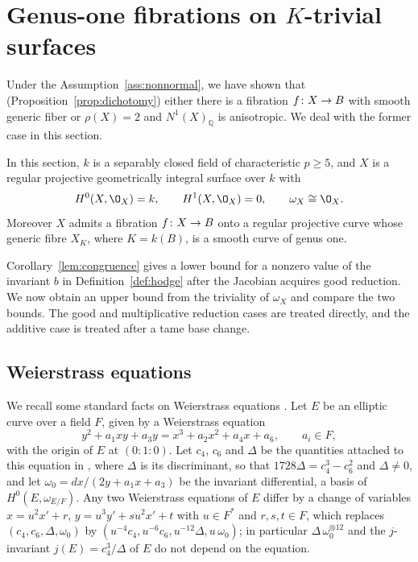 \section{Genus-one fibrations on $K$-trivial surfaces}\label{sec:genus-one}
Under the Assumption~\ref{ass:nonnormal}, we have shown that (Proposition~\ref{prop:dichotomy}) either there is a fibration $f\colon X\to B$ with smooth generic fiber or $\rho(X) = 2$ and $N^1(X)_{\mathbb Q}$ is anisotropic.
We deal with the former case in this section.

\begin{assumption}\label{ass:genus-one}
In this section, $k$ is a separably closed field of characteristic $p\geq 5$, and $X$ is a regular projective geometrically integral surface over $k$ with
\[
  H^0(X,\O_X) = k,\qquad H^1(X,\O_X) = 0,\qquad \omega_X\cong\O_X.
\]
Moreover $X$ admits a fibration $f\colon X\to B$ onto a regular projective curve whose generic fibre $X_K$, where $K = k(B)$, is a smooth curve of genus one.
\end{assumption}

Corollary~\ref{lem:congruence} gives a lower bound for a nonzero value of the invariant $b$ in Definition~\ref{def:hodge} after the Jacobian acquires good reduction.
We now obtain an upper bound from the triviality of $\omega_X$ and compare the two bounds.
The good and multiplicative reduction cases are treated directly, and the additive case is treated after a tame base change.


\subsection{Weierstrass equations}\label{subsec:weierstrass}

We recall some standard facts on Weierstrass equations \cite[\S1, (2.6) and Proposition~5.1]{Del75}.
Let $E$ be an elliptic curve over a field $F$, given by a Weierstrass equation
\[
  y^2+a_1xy+a_3y = x^3+a_2x^2+a_4x+a_6,\qquad a_i\in F,
\]
with the origin of $E$ at $(0:1:0)$.
Let $c_4$, $c_6$ and $\Delta$ be the quantities attached to this equation in \cite[(1.4) and (1.5)]{Del75}, where $\Delta$ is its discriminant, so that $1728\Delta = c_4^3-c_6^2$ and $\Delta\neq 0$, and let $\omega_0 = dx/(2y+a_1x+a_3)$ be the invariant differential, a basis of $H^0(E,\omega_{E/F})$.
Any two Weierstrass equations of $E$ differ by a change of variables $x = u^2x'+r$, $y = u^3y'+su^2x'+t$ with $u\in F^*$ and $r,s,t\in F$, which replaces $(c_4,c_6,\Delta,\omega_0)$ by $(u^{-4}c_4,u^{-6}c_6,u^{-12}\Delta,u\,\omega_0)$; in particular $\Delta\,\omega_0^{\otimes 12}$ and the $j$-invariant $j(E) = c_4^3/\Delta$ of $E$ do not depend on the equation.


